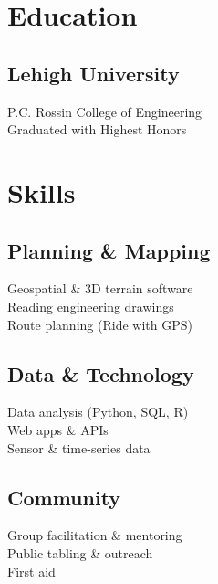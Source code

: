 \documentclass[]{deedy-resume-openfont}
\begin{document}
\lastupdated


\begin{minipage}[t]{0.30\textwidth}

\section{Education}
\subsection{Lehigh University}
P.C. Rossin College of Engineering \\
Graduated with Highest Honors
\sectionsep

\section{Skills}
\subsection{Planning \& Mapping}
Geospatial \& 3D terrain software \\
Reading engineering drawings \\
Route planning (Ride with GPS) \\
\sectionsep
\subsection{Data \& Technology}
Data analysis (Python, SQL, R) \\
Web apps \& APIs \\
Sensor \& time-series data \\
\sectionsep
\subsection{Community}
Group facilitation \& mentoring \\
Public tabling \& outreach \\
First aid \\
\sectionsep


\end{minipage}
\end{document}
